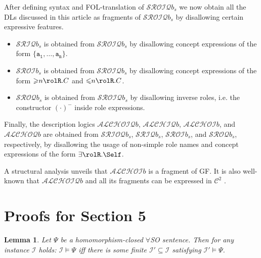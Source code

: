 \documentclass[10pt,a4paper]{amsart}
\theoremstyle{definition}
\numberwithin{equation}{section}
\theoremstyle{plain}
\newtheorem{lemma}[lemma]{Lemma}
\theoremstyle{definition}
\theoremstyle{myexample}
\theoremstyle{plain}
\theoremstyle{definition}
\newcommand{\instance}{\mathcal{I}}
\newcommand{\iffi}{\textit{iff} } %
\begin{document}
\medskip

After defining syntax and FOL-translation of $\mathcal{SROIQ}b_s$ we now obtain all the DLs discussed in this article as fragments of $\mathcal{SROIQ}b_s$ by disallowing certain expressive features.

\begin{itemize}
\item $\mathcal{SRIQ}b_s$ is obtained from $\mathcal{SROIQ}b_s$ by disallowing concept expressions of the form $\{\mathtt{a_1}, \ldots, \mathtt{a_n}\}$.
\item $\mathcal{SROI}b_s$ is obtained from $\mathcal{SROIQ}b_s$ by disallowing concept expressions of the form
${\geqslant}n\rolR. C$ and ${\leqslant}n\rolR. C$. 
\item $\mathcal{SROQ}b_s$ is obtained from $\mathcal{SROIQ}b_s$ by disallowing inverse roles, i.e. the constructor $(\cdot)^-$ inside role expressions.	
\end{itemize} 
Finally, the description logics $\mathcal{ALCHOIQ}b$, $\mathcal{ALCHIQ}b$, $\mathcal{ALCHOI}b$, and $\mathcal{ALCHOQ}b$ are obtained from $\mathcal{SRIOQ}b_s$, $\mathcal{SRIQ}b_s$, $\mathcal{SROI}b_s$, and $\mathcal{SROQ}b_s$, respectively, by disallowing the usage of non-simple role names and concept expressions of the form $\exists\rolR.\Self$.

A structural analysis unveils that $\mathcal{ALCHOI}b$ is a fragment of GF. It is also well-known that $\mathcal{ALCHOIQ}b$ and all its fragments can be expressed in $\mathcal{C}^2$ \cite{RudolphKH08b}.


\section{Proofs for Section 5}

\begin{lemma}\label{lem:interesting}
Let $\Psi$ be a homomorphism-closed $\forall$SO sentence.
Then for any instance $\instance$ holds: $\instance \models \Psi$ \iffi there is some finite $\instance' \subseteq \instance$ satisfying $\instance' \models \Psi$.
\end{lemma}
\end{document}
